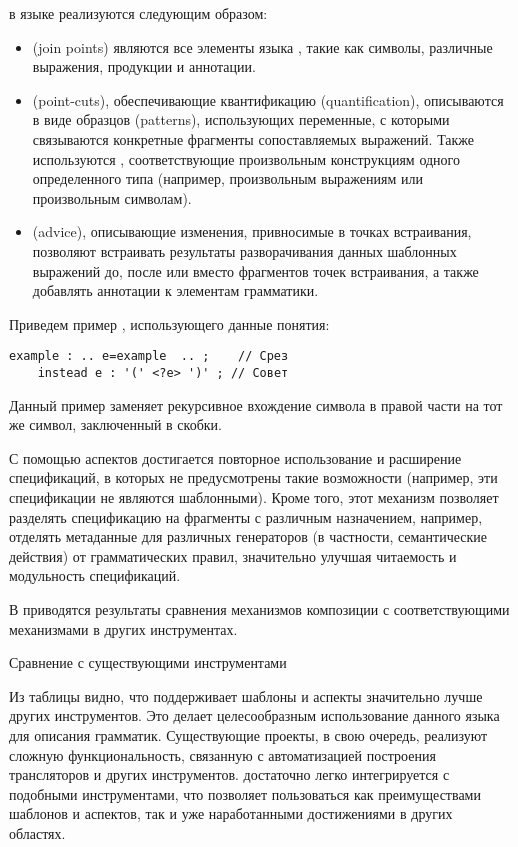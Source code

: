  в языке \GRM{} реализуются следующим образом:
\begin{itemize}
\item {} (join points) являются все элементы языка \GRM{}, такие как символы, различные выражения, продукции и аннотации.
\item {} (point-cuts), обеспечивающие квантификацию (quantification), описываются в виде образцов (patterns), использующих переменные, с которыми связываются конкретные фрагменты сопоставляемых выражений. Также используются , соответствующие произвольным конструкциям одного определенного типа (например, произвольным выражениям или произвольным символам).
\item {} (advice), описывающие изменения, привносимые в точках встраивания, позволяют встраивать результаты разворачивания данных шаблонных выражений до, после или вместо фрагментов точек встраивания, а также добавлять аннотации к элементам грамматики.
\end{itemize}
Приведем пример , использующего данные понятия:
\begin{lstlisting}
example : .. e=example  .. ;    // Срез
	instead e : '(' <?e> ')' ; // Совет
\end{lstlisting}
Данный пример заменяет рекурсивное вхождение символа  в правой части на тот же символ, заключенный в скобки.

С помощью аспектов достигается повторное использование  и расширение спецификаций, в которых не предусмотрены такие возможности (например, эти спецификации не являются шаблонными). Кроме того, этот механизм позволяет разделять спецификацию на фрагменты с различным назначением, например, отделять метаданные для различных генераторов (в частности, семантические действия) от грамматических правил, значительно улучшая читаемость и модульность спецификаций.

В  приводятся результаты сравнения механизмов композиции \GRM{} с соответствующими механизмами в других инструментах.
\begin{table}[htb]
	\centering
\newcommand{\dissonly}[1]{}
\newcommand{\size}{\small}

	\caption{Сравнение \GRM{} с существующими инструментами}\label{GrmTable}
\end{table}
Из таблицы видно, что \GRM{} поддерживает шаблоны и аспекты значительно лучше других инструментов. Это делает целесообразным использование данного языка для описания грамматик. Существующие проекты, в свою очередь, реализуют сложную функциональность, связанную с автоматизацией построения трансляторов и других инструментов. \GRM{} достаточно легко интегрируется с подобными инструментами, что позволяет пользоваться как преимуществами шаблонов и аспектов, так и уже наработанными достижениями в других областях. 

